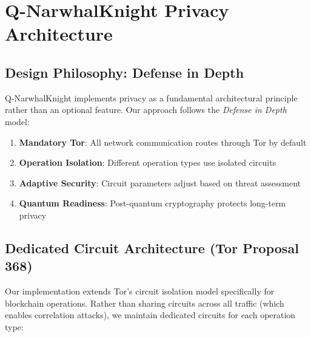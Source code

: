 \documentclass[11pt,a4paper]{article}
\begin{document}
\section{Q-NarwhalKnight Privacy Architecture}

\subsection{Design Philosophy: Defense in Depth}

Q-NarwhalKnight implements privacy as a fundamental architectural principle rather than an optional feature. Our approach follows the \textit{Defense in Depth} model:

\begin{enumerate}[leftmargin=*]
    \item \textbf{Mandatory Tor}: All network communication routes through Tor by default
    \item \textbf{Operation Isolation}: Different operation types use isolated circuits
    \item \textbf{Adaptive Security}: Circuit parameters adjust based on threat assessment
    \item \textbf{Quantum Readiness}: Post-quantum cryptography protects long-term privacy
\end{enumerate}

\subsection{Dedicated Circuit Architecture (Tor Proposal 368)}

Our implementation extends Tor's circuit isolation model specifically for blockchain operations. Rather than sharing circuits across all traffic (which enables correlation attacks), we maintain dedicated circuits for each operation type:
\end{document}
